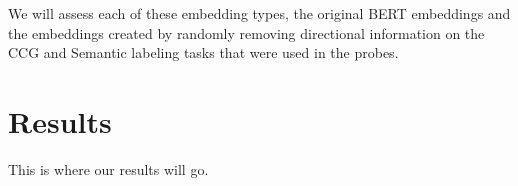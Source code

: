 \documentclass[11pt,a4paper]{article}
\begin{document}
We will assess each of these embedding types, the original BERT embeddings and the embeddings created by randomly removing directional information on the CCG and Semantic labeling tasks that were used in the probes. 





\section{Results}
\label{sec:result}


This is where our results will go. 
\end{document}
